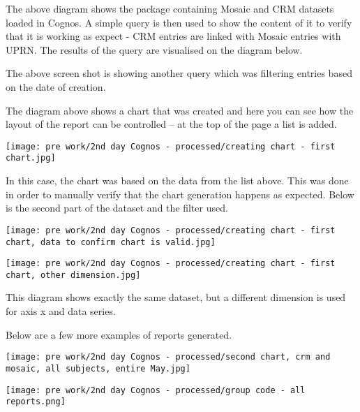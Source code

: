 The above diagram shows the package containing Mosaic and CRM datasets loaded in Cognos. A simple query is then used to show the content of it to verify that it is working as expect - CRM entries are linked with Mosaic entries with UPRN. The results of the query are visualised on the diagram below.

The above screen shot is showing another query which was filtering entries based on the date of creation.

The diagram above shows a chart that was created and here you can see how the layout of the report can be controlled – at the top of the page a list is added.

\begin{center}
  \texttt{[image: pre work/2nd day Cognos - processed/creating chart - first chart.jpg]}
\end{center}

In this case, the chart was based on the data from the list above. This was done in order to manually verify that the chart generation happens as expected. Below is the second part of the dataset and the filter used.

\begin{center}
  \texttt{[image: pre work/2nd day Cognos - processed/creating chart - first chart, data to confirm chart is valid.jpg]}
\end{center}

\begin{center}
  \texttt{[image: pre work/2nd day Cognos - processed/creating chart - first chart, other dimension.jpg]}
\end{center}

This diagram shows exactly the same dataset, but a different dimension is used for axis x and data series.

Below are a few more examples of reports generated.

\begin{center}
  \texttt{[image: pre work/2nd day Cognos - processed/second chart, crm and mosaic, all subjects, entire May.jpg]}
\end{center}

\begin{center}
  \texttt{[image: pre work/2nd day Cognos - processed/group code - all reports.png]}
\end{center}


